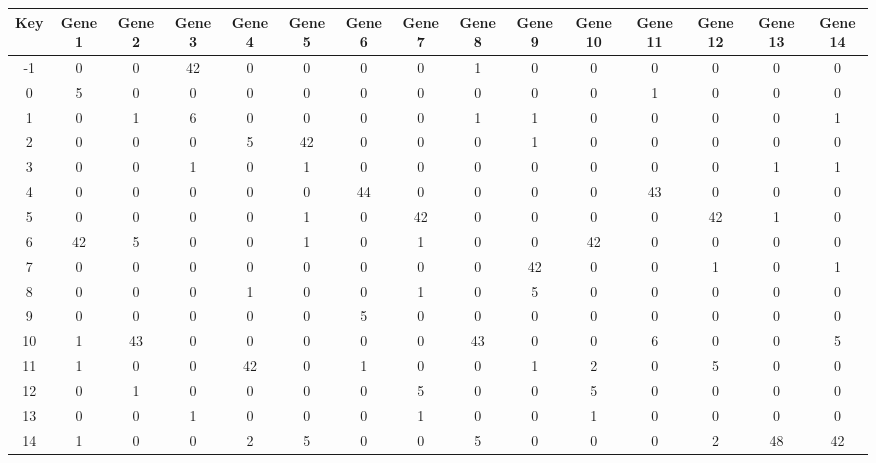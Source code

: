 \begin{tabular}{|c|c|c|c|c|c|c|c|c|c|c|c|c|c|c|}
\hline
Key & Gene 1 & Gene 2 & Gene 3 & Gene 4 & Gene 5 & Gene 6 & Gene 7 & Gene 8 & Gene 9 & Gene 10 & Gene 11 & Gene 12 & Gene 13 & Gene 14 \\
\hline
-1 & 0 & 0 & 42 & 0 & 0 & 0 & 0 & 1 & 0 & 0 & 0 & 0 & 0 & 0 \\
0 & 5 & 0 & 0 & 0 & 0 & 0 & 0 & 0 & 0 & 0 & 1 & 0 & 0 & 0 \\
1 & 0 & 1 & 6 & 0 & 0 & 0 & 0 & 1 & 1 & 0 & 0 & 0 & 0 & 1 \\
2 & 0 & 0 & 0 & 5 & 42 & 0 & 0 & 0 & 1 & 0 & 0 & 0 & 0 & 0 \\
3 & 0 & 0 & 1 & 0 & 1 & 0 & 0 & 0 & 0 & 0 & 0 & 0 & 1 & 1 \\
4 & 0 & 0 & 0 & 0 & 0 & 44 & 0 & 0 & 0 & 0 & 43 & 0 & 0 & 0 \\
5 & 0 & 0 & 0 & 0 & 1 & 0 & 42 & 0 & 0 & 0 & 0 & 42 & 1 & 0 \\
6 & 42 & 5 & 0 & 0 & 1 & 0 & 1 & 0 & 0 & 42 & 0 & 0 & 0 & 0 \\
7 & 0 & 0 & 0 & 0 & 0 & 0 & 0 & 0 & 42 & 0 & 0 & 1 & 0 & 1 \\
8 & 0 & 0 & 0 & 1 & 0 & 0 & 1 & 0 & 5 & 0 & 0 & 0 & 0 & 0 \\
9 & 0 & 0 & 0 & 0 & 0 & 5 & 0 & 0 & 0 & 0 & 0 & 0 & 0 & 0 \\
10 & 1 & 43 & 0 & 0 & 0 & 0 & 0 & 43 & 0 & 0 & 6 & 0 & 0 & 5 \\
11 & 1 & 0 & 0 & 42 & 0 & 1 & 0 & 0 & 1 & 2 & 0 & 5 & 0 & 0 \\
12 & 0 & 1 & 0 & 0 & 0 & 0 & 5 & 0 & 0 & 5 & 0 & 0 & 0 & 0 \\
13 & 0 & 0 & 1 & 0 & 0 & 0 & 1 & 0 & 0 & 1 & 0 & 0 & 0 & 0 \\
14 & 1 & 0 & 0 & 2 & 5 & 0 & 0 & 5 & 0 & 0 & 0 & 2 & 48 & 42 \\
\hline
\end{tabular}